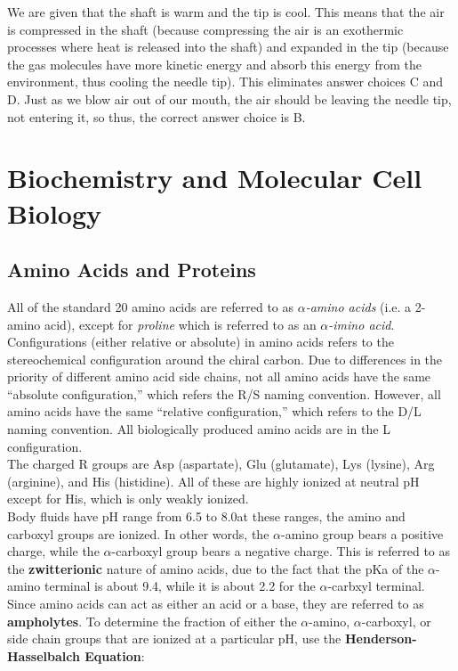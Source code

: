 \documentclass{article}
\theoremstyle{plain}%
\theoremstyle{definition}
\theoremstyle{remark}
\begin{document}
\noindent We are given that the shaft is warm and the tip is cool. This means that the air is compressed in the shaft (because compressing the air is an exothermic processes where heat is released into the shaft) and expanded in the tip (because the gas molecules have more kinetic energy and absorb this energy from the environment, thus cooling the needle tip). This eliminates answer choices C and D. Just as we blow air out of our mouth, the air should be leaving the needle tip, not entering it, so thus, the correct answer choice is B. 

\section{Biochemistry and Molecular Cell Biology}
\subsection{Amino Acids and Proteins}
All of the standard 20 amino acids are referred to as \textit{$\alpha$-amino acids} (i.e. a 2-amino acid), except for \textit{proline} which is referred to as an \textit{$\alpha$-imino acid}. Configurations (either relative or absolute) in amino acids refers to the stereochemical configuration around the chiral carbon. Due to differences in the priority of different amino acid side chains, not all amino acids have the same ``absolute configuration,'' which refers the R/S naming convention. However, all amino acids have the same ``relative configuration,'' which refers to the D/L naming convention. All biologically produced amino acids are in the L configuration. \\ 
\indent The charged R groups are Asp (aspartate), Glu (glutamate), Lys (lysine), Arg (arginine), and His (histidine). All of these are highly ionized at neutral pH except for His, which is only weakly ionized.\\
\indent Body fluids have pH range from 6.5 to 8.0\textemdash at these ranges, the amino and carboxyl groups are ionized. In other words, the $\alpha$-amino group bears a positive charge, while the $\alpha$-carboxyl group bears a negative charge. This is referred to as the \textbf{zwitterionic} nature of amino acids, due to the fact that the pKa of the $\alpha$-amino terminal is about 9.4, while it is about 2.2 for the $\alpha$-carbxyl terminal. Since amino acids can act as either an acid or a base, they are referred to as \textbf{ampholytes}. To determine the fraction of either the $\alpha$-amino, $\alpha$-carboxyl, or side chain groups that are ionized at a particular pH, use the \textbf{Henderson-Hasselbalch Equation}:
\end{document}
